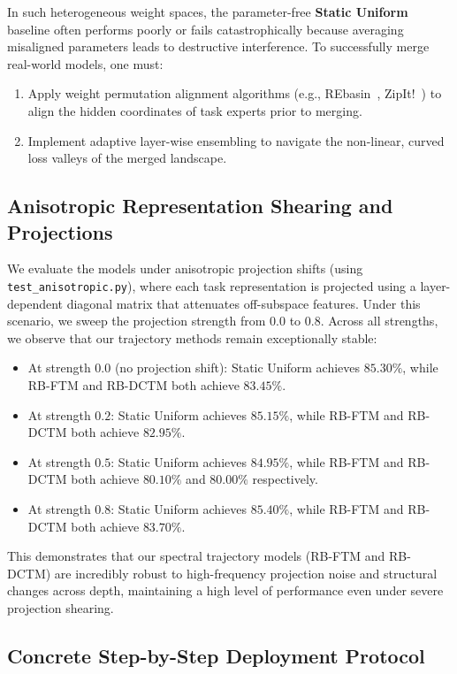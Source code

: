 In such heterogeneous weight spaces, the parameter-free \textbf{Static Uniform} baseline often performs poorly or fails catastrophically because averaging misaligned parameters leads to destructive interference. To successfully merge real-world models, one must:
\begin{enumerate}
    \item Apply weight permutation alignment algorithms (e.g., REbasin~\cite{ainsworth2022git}, ZipIt!~\cite{stoica2023zipit}) to align the hidden coordinates of task experts prior to merging.
    \item Implement adaptive layer-wise ensembling to navigate the non-linear, curved loss valleys of the merged landscape.
\end{enumerate}


\subsection{Anisotropic Representation Shearing and Projections}
\label{sec:appendix_anisotropic}
We evaluate the models under anisotropic projection shifts (using \texttt{test\_anisotropic.py}), where each task representation is projected using a layer-dependent diagonal matrix that attenuates off-subspace features. Under this scenario, we sweep the projection strength from $0.0$ to $0.8$. Across all strengths, we observe that our trajectory methods remain exceptionally stable:
\begin{itemize}
    \item At strength $0.0$ (no projection shift): Static Uniform achieves $85.30\%$, while RB-FTM and RB-DCTM both achieve $83.45\%$.
    \item At strength $0.2$: Static Uniform achieves $85.15\%$, while RB-FTM and RB-DCTM both achieve $82.95\%$.
    \item At strength $0.5$: Static Uniform achieves $84.95\%$, while RB-FTM and RB-DCTM both achieve $80.10\%$ and $80.00\%$ respectively.
    \item At strength $0.8$: Static Uniform achieves $85.40\%$, while RB-FTM and RB-DCTM both achieve $83.70\%$.
\end{itemize}
This demonstrates that our spectral trajectory models (RB-FTM and RB-DCTM) are incredibly robust to high-frequency projection noise and structural changes across depth, maintaining a high level of performance even under severe projection shearing.


\subsection{Concrete Step-by-Step Deployment Protocol}
\label{sec:appendix_deployment_steps}


